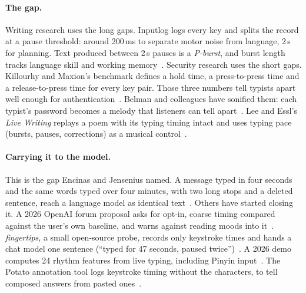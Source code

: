 \documentclass[10pt,letterpaper,twocolumn]{article}
\begin{document}
\paragraph{The gap.} Writing research uses the long gaps. Inputlog logs every key and splits the record at a pause threshold: around 200\,ms to separate motor noise from language, 2\,s for planning. Text produced between 2\,s pauses is a \emph{P-burst}, and burst length tracks language skill and working memory~\citep{chenoweth2001fluency,leijten2013inputlog}. Security research uses the short gaps. Killourhy and Maxion's benchmark defines a hold time, a press-to-press time and a release-to-press time for every key pair. Those three numbers tell typists apart well enough for authentication~\citep{killourhy2009comparing}. Belman and colleagues have sonified them: each typist's password becomes a melody that listeners can tell apart~\citep{belman2020melody}. Lee and Essl's \emph{Live Writing} replays a poem with its typing timing intact and uses typing pace (bursts, pauses, corrections) as a musical control~\citep{lee2016livewriting}.

\paragraph{Carrying it to the model.} This is the gap Encinas and Jensenius named. A message typed in four seconds and the same words typed over four minutes, with two long stops and a deleted sentence, reach a language model as identical text~\citep{encinas2026vyping}. Others have started closing it. A 2026 OpenAI forum proposal asks for opt-in, coarse timing compared against the user's own baseline, and warns against reading moods into it~\citep{openai2026timing}. \emph{fingertips}, a small open-source probe, records only keystroke times and hands a chat model one sentence (``typed for 47 seconds, paused twice'')~\citep{fingertips2026}. A 2026 demo computes 24 rhythm features from live typing, including Pinyin input~\citep{chen2026crpl}. The Potato annotation tool logs keystroke timing without the characters, to tell composed answers from pasted ones~\citep{potato_keystroke}.
\end{document}
